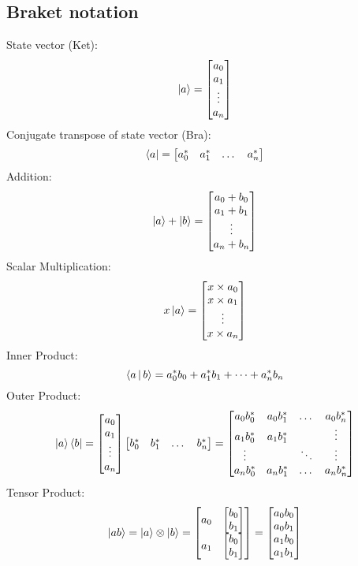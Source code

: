\documentclass{article}
\begin{document}
\subsection*{Braket notation}
State vector (Ket): 
$$\Ket{a} = 
\begin{bmatrix}
    a_0\\
    a_1\\
    \vdots\\
    a_n
\end{bmatrix}
$$
Conjugate transpose of state vector (Bra): 
$$\Bra{a} = 
\begin{bmatrix}
    a^*_0 & a^*_1 & \dots & a^*_n
\end{bmatrix}
$$
Addition:
$$\Ket{a}+\Ket{b}=
\begin{bmatrix}
    a_0+b_0\\
    a_1+b_1\\
    \vdots\\
    a_n+b_n
\end{bmatrix}
$$
Scalar Multiplication:
$$
    x\Ket{a}=
    \begin{bmatrix}
        x\times a_0\\
        x\times a_1\\
        \vdots\\
        x\times a_n
    \end{bmatrix}
$$
Inner Product:
$$\Braket{a|b}=a^*_0b_0+a^*_1b_1+\dots+a^*_nb_n$$
Outer Product:
$$\Ket{a}\Bra{b}=
\begin{bmatrix}
    a_0\\
    a_1\\
    \vdots\\
    a_n
\end{bmatrix}
\begin{bmatrix}
    b^*_0 & b^*_1 & \dots & b^*_n
\end{bmatrix}
=
\begin{bmatrix}
    a_0b^*_0 & a_0b^*_1 & \dots  & a_0b^*_n\\
    a_1b^*_0 & a_1b^*_1 &        & \vdots\\
    \vdots   &          & \ddots & \vdots\\
    a_nb^*_0 & a_nb^*_1 & \dots  & a_nb^*_n
\end{bmatrix}
$$
Tensor Product:
$$
\Ket{ab}=\Ket{a}\otimes\Ket{b}=
\begin{bmatrix}
    a_0 & \begin{bmatrix} b_0\\b_1\end{bmatrix}\\
    a_1 & \begin{bmatrix} b_0\\b_1\end{bmatrix}
\end{bmatrix}=
\begin{bmatrix}
    a_0b_0\\
    a_0b_1\\
    a_1b_0\\
    a_1b_1\\
\end{bmatrix}
$$
\newpage
\end{document}
